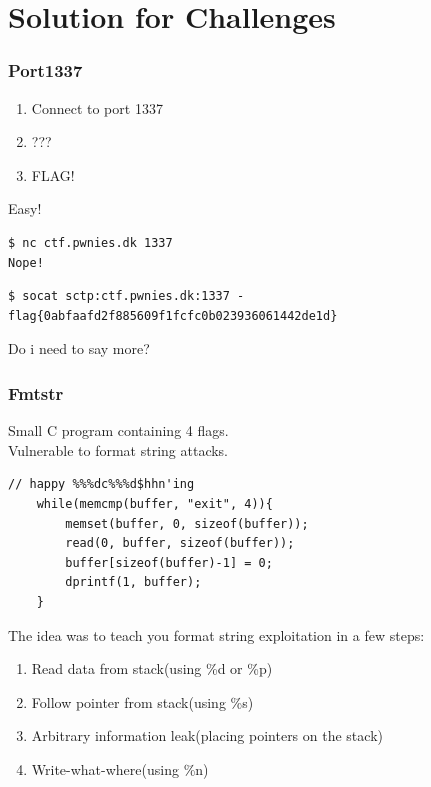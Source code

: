 \documentclass{beamer}
\begin{document}
\section{Solution for Challenges}

\begin{frame}
    \pause
\end{frame}

\begin{frame}[fragile]
    \frametitle{Port1337}
    \begin{enumerate}
        \item Connect to port 1337
        \item ???
        \item FLAG!
    \end{enumerate}

    \pause

    Easy!

    \pause     

    \begin{verbatim}
$ nc ctf.pwnies.dk 1337
Nope!
    \end{verbatim}

    \pause

    \begin{verbatim}
$ socat sctp:ctf.pwnies.dk:1337 -
flag{0abfaafd2f885609f1fcfc0b023936061442de1d}
    \end{verbatim}
    
    \pause
    
    Do i need to say more?
\end{frame}

\begin{frame}[fragile]
    \frametitle{Fmtstr}

    Small C program containing 4 flags. \\
    Vulnerable to format string attacks.

    \begin{lstlisting}[style=customc]
    // happy %%%dc%%%d$hhn'ing
    while(memcmp(buffer, "exit", 4)){
        memset(buffer, 0, sizeof(buffer));
        read(0, buffer, sizeof(buffer));
        buffer[sizeof(buffer)-1] = 0;
        dprintf(1, buffer);
    }
    \end{lstlisting}

    \pause

    The idea was to teach you format string exploitation in a few steps:
    \begin{enumerate}
        \pause \item Read data from stack(using \%d or \%p)
        \pause \item Follow pointer from stack(using \%s)
        \pause \item Arbitrary information leak(placing pointers on the stack)
        \pause \item Write-what-where(using \%n)
    \end{enumerate}
\end{frame}
\end{document}

